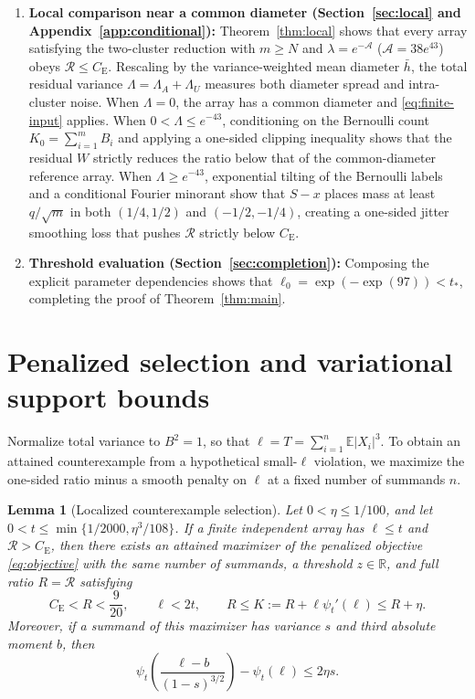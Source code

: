 \documentclass[11pt]{article}
\numberwithin{equation}{section}
\newtheorem{lemma}[theorem]{Lemma}
\theoremstyle{remark}
\DeclareMathOperator{\Var}{Var}
\newcommand{\E}{\mathbb E}
\newcommand{\R}{\mathbb R}
\newcommand{\be}{C_{\mathrm E}}
\begin{document}
\begin{enumerate}[label=(\arabic*),leftmargin=2em]
$|U_i|\le\lambda h$) and small-diameter variables $Z_j$ with
$|Z_j|\le\lambda h$ and total variance $\sum_j\Var Z_j\le\lambda mh^2$
(Proposition~\ref{prop:reduction}).
\item \textbf{Local comparison near a common diameter
(Section~\ref{sec:local} and Appendix~\ref{app:conditional}):}
Theorem~\ref{thm:local} shows that every array satisfying the two-cluster
reduction with $m\ge N$ and $\lambda=e^{-\mathcal A}$ ($\mathcal A=38e^{43}$)
obeys $\mathcal R\le\be$. Rescaling by the variance-weighted mean diameter
$\bar h$, the total residual variance $\Lambda=\Lambda_A+\Lambda_U$ measures
both diameter spread and intra-cluster noise. When $\Lambda=0$, the array has
a common diameter and \eqref{eq:finite-input} applies. When $0<\Lambda\le e^{-43}$,
conditioning on the Bernoulli count $K_0=\sum_{i=1}^mB_i$ and applying a
one-sided clipping inequality shows that the residual $W$ strictly reduces
the ratio below that of the common-diameter reference array. When
$\Lambda\ge e^{-43}$, exponential tilting of the Bernoulli labels and a
conditional Fourier minorant show that $S-x$ places mass at least
$q/\sqrt m$ in both $(1/4,1/2)$ and $(-1/2,-1/4)$, creating a one-sided
jitter smoothing loss that pushes $\mathcal R$ strictly below $\be$.
\item \textbf{Threshold evaluation (Section~\ref{sec:completion}):}
Composing the explicit parameter dependencies shows that
$\ell_0=\exp(-\exp(97))<t_*$, completing the proof of Theorem~\ref{thm:main}.
\end{enumerate}

\section{Penalized selection and variational support bounds}\label{sec:selection}

Normalize total variance to $B^2=1$, so that $\ell=T=\sum_{i=1}^n\E|X_i|^3$.
To obtain an attained counterexample from a hypothetical small-$\ell$
violation, we maximize the one-sided ratio minus a smooth penalty on $\ell$
at a fixed number of summands $n$.

\begin{lemma}[Localized counterexample selection]\label{lem:selection}
Let $0<\eta\le1/100$, and let $0<t\le\min\{1/2000,\eta^3/108\}$. If a finite
independent array has $\ell\le t$ and $\mathcal R>\be$, then there exists an
attained maximizer of the penalized objective \eqref{eq:objective} with the
same number of summands, a threshold $z\in\R$, and full ratio $R=\mathcal R$
satisfying
\begin{equation}\label{eq:selected}
 \be<R<\frac9{20},\qquad\ell<2t,\qquad
 R\le K:=R+\ell\psi_t'(\ell)\le R+\eta.
\end{equation}
Moreover, if a summand of this maximizer has variance $s$ and third absolute
moment $b$, then
\begin{equation}\label{eq:deletion-penalty}
 \psi_t\!\left(\frac{\ell-b}{(1-s)^{3/2}}\right)-\psi_t(\ell)
                         \le2\eta s.
\end{equation}
\end{lemma}
\end{document}
